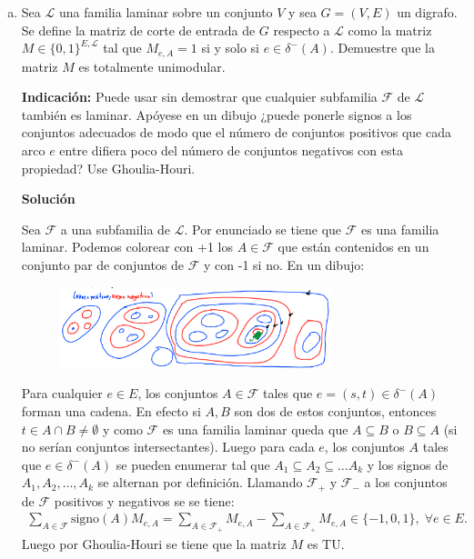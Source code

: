 \documentclass{article}
\theoremstyle{plain}
\theoremstyle{definition}
\theoremstyle{Azul}
\begin{document}
\begin{enumerate}[(a)]
\item Sea $\mathcal{L}$ una familia laminar sobre un conjunto $V$ y sea $G=(V,E)$ un digrafo. Se define la matriz de corte de entrada de $G$ respecto a $\mathcal{L}$ como la matriz $M\in \{0,1\}^{E,\mathcal{L}}$ tal que $M_{e, A}=1$ si y solo si $e\in \delta^-(A)$. 
Demuestre que la matriz $M$ es totalmente unimodular.

\textbf{Indicación:} Puede usar sin demostrar que cualquier subfamilia $\mathcal{F}$ de $\mathcal{L}$ también es laminar. Apóyese en un dibujo ¿puede ponerle signos a los conjuntos adecuados de modo que el número de conjuntos positivos que cada arco $e$ entre difiera poco del número de conjuntos negativos con esta propiedad? Use Ghoulia-Houri.

\textbf{Solución}

Sea $\mathcal{F}$ a una subfamilia de $\mathcal{L}$. Por enunciado se tiene que $\mathcal{F}$ es una familia laminar. Podemos colorear con +1 los $A\in\mathcal{F}$ que están contenidos en un conjunto par de conjuntos de $\mathcal{F}$ y con -1 si no. En un dibujo:

\begin{figure}[H]
	\centering
	\includegraphics[width=0.75\textwidth]{laminar_set.png}
\end{figure}

Para cualquier $e\in E$, los conjuntos  $A\in \mathcal{F}$ tales que  $e=(s,t)\in \delta^-(A)$ forman una cadena. En efecto si $A, B$ son dos de estos conjuntos, entonces $t\in A\cap B \neq \emptyset$ y como $\mathcal{F}$ es una familia laminar queda que $A\subseteq B$ o $B\subseteq A$ (si no serían conjuntos intersectantes).
Luego para cada $e$, los conjuntos $A$ tales que $e\in \delta^-(A)$ se pueden enumerar tal que $A_1\subseteq A_2 \subseteq \dots A_k$ y los signos de $A_1, A_2, \dots, A_k$ se alternan por  definición. Llamando $\mathcal{F}_+$ y $\mathcal{F}_-$ a los conjuntos de $\mathcal{F}$ positivos y negativos se se tiene: 
\begin{align*}
    \sum_{A\in \mathcal{F}}\text{signo}(A)M_{e,A}=\sum_{A\in \mathcal{F}_{+}}M_{e,A}-\sum_{A\in \mathcal{F}_{+}}M_{e,A}\in\{-1,0,1\}, \; \forall e \in E.
\end{align*}
Luego por Ghoulia-Houri se tiene que la matriz $M$ es TU.


\end{enumerate}
\end{document}
